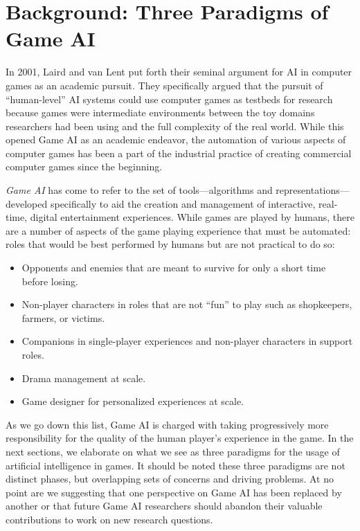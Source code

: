 \documentclass[conference]{IEEEtran}
\begin{document}

\section{Background: Three Paradigms of Game AI}


In 2001, Laird and van Lent \cite{laird2001:gameai} put forth their seminal argument for AI in computer games as an academic pursuit. 
They specifically argued that the pursuit of ``human-level'' AI systems could use computer games as testbeds for research because games were intermediate environments between the toy domains researchers had been using and the full complexity of the real world.
While this opened Game AI as an academic endeavor, the automation of various aspects of computer games has been a part of the industrial practice of creating commercial computer games since the beginning. 

{\em Game AI} has come to refer to the set of tools---algorithms and representations---developed specifically to aid the creation and management of interactive, real-time, digital entertainment experiences.
While games are played by humans, there are a number of aspects of the game playing experience that must be automated: roles that would be best performed by humans but are not practical to do so:

\begin{itemize}
\item Opponents and enemies that are meant to survive for only a short time before losing.
\item Non-player characters in roles that are not ``fun'' to play such as shopkeepers, farmers, or victims.
\item Companions in single-player experiences and non-player characters in support roles.
\item Drama management at scale.
\item Game designer for personalized experiences at scale.
\end{itemize}

\noindent
As we go down this list, Game AI is charged with taking progressively more responsibility for the quality of the human player's experience in the game.
%
In the next sections, we elaborate on what we see as three paradigms for the usage of artificial intelligence in games.
It should be noted these three paradigms are not distinct phases, but overlapping sets of concerns and driving problems. 
At no point are we suggesting that one perspective on Game AI has been replaced by another or that future Game AI researchers should abandon their valuable contributions to work on new research questions.
\end{document}
